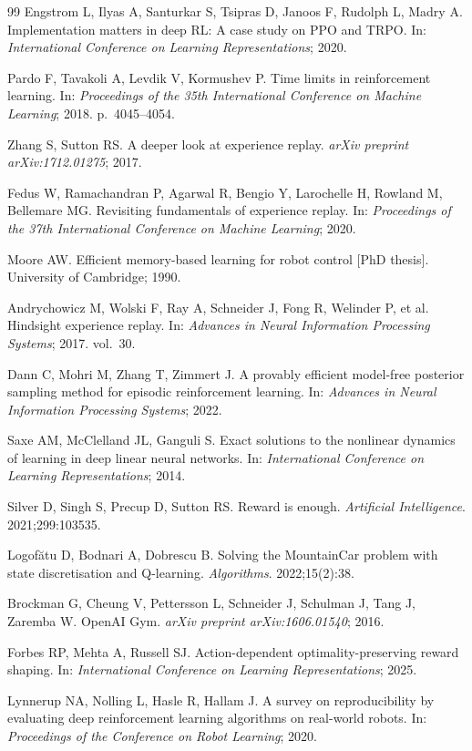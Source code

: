 \documentclass[a4paper,12pt]{article}
\begin{document}
\begin{thebibliography}{99}
Engstrom L, Ilyas A, Santurkar S, Tsipras D, Janoos F, Rudolph L, Madry A.
Implementation matters in deep RL: A case study on PPO and TRPO.
In: \textit{International Conference on Learning Representations}; 2020.

Pardo F, Tavakoli A, Levdik V, Kormushev P.
Time limits in reinforcement learning.
In: \textit{Proceedings of the 35th International Conference on Machine Learning}; 2018. p.~4045--4054.

Zhang S, Sutton RS.
A deeper look at experience replay.
\textit{arXiv preprint arXiv:1712.01275}; 2017.

Fedus W, Ramachandran P, Agarwal R, Bengio Y, Larochelle H, Rowland M, Bellemare MG.
Revisiting fundamentals of experience replay.
In: \textit{Proceedings of the 37th International Conference on Machine Learning}; 2020.

Moore AW.
Efficient memory-based learning for robot control [PhD thesis].
University of Cambridge; 1990.

Andrychowicz M, Wolski F, Ray A, Schneider J, Fong R, Welinder P, et al.
Hindsight experience replay.
In: \textit{Advances in Neural Information Processing Systems}; 2017. vol.~30.

Dann C, Mohri M, Zhang T, Zimmert J.
A provably efficient model-free posterior sampling method for episodic reinforcement learning.
In: \textit{Advances in Neural Information Processing Systems}; 2022.

Saxe AM, McClelland JL, Ganguli S.
Exact solutions to the nonlinear dynamics of learning in deep linear neural networks.
In: \textit{International Conference on Learning Representations}; 2014.

Silver D, Singh S, Precup D, Sutton RS.
Reward is enough.
\textit{Artificial Intelligence}. 2021;299:103535.

Logof\u{a}tu D, Bodnari A, Dobrescu B.
Solving the MountainCar problem with state discretisation and Q-learning.
\textit{Algorithms}. 2022;15(2):38.

Brockman G, Cheung V, Pettersson L, Schneider J, Schulman J, Tang J, Zaremba W.
OpenAI Gym.
\textit{arXiv preprint arXiv:1606.01540}; 2016.

Forbes RP, Mehta A, Russell SJ.
Action-dependent optimality-preserving reward shaping.
In: \textit{International Conference on Learning Representations}; 2025.

Lynnerup NA, Nolling L, Hasle R, Hallam J.
A survey on reproducibility by evaluating deep reinforcement learning algorithms on real-world robots.
In: \textit{Proceedings of the Conference on Robot Learning}; 2020.

\end{thebibliography}
\end{document}
